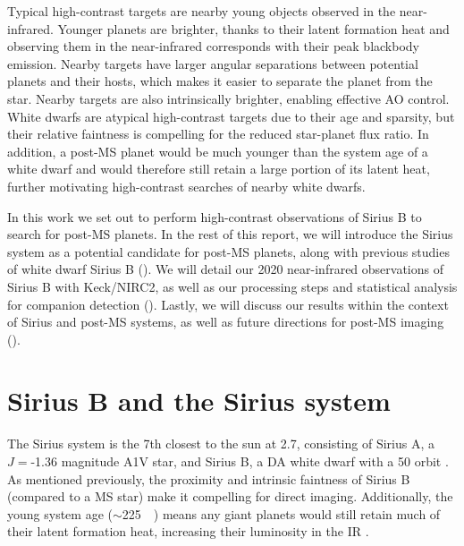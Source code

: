 \documentclass[twocolumn,linenumbers]{aastex631}
\begin{document}
Typical high-contrast targets are nearby young objects observed in the near-infrared. Younger planets are brighter, thanks to their latent formation heat \citep{fortneyGiantPlanetInterior2010} and observing them in the near-infrared corresponds with their peak blackbody emission. Nearby targets have larger angular separations between potential planets and their hosts, which makes it easier to separate the planet from the star. Nearby targets are also intrinsically brighter, enabling effective AO control. White dwarfs are atypical high-contrast targets due to their age and sparsity, but their relative faintness is compelling for the reduced star-planet flux ratio. In addition, a post-MS planet would be much younger than the system age of a white dwarf and would therefore still retain a large portion of its latent heat, further motivating high-contrast searches of nearby white dwarfs.

In this work we set out to perform high-contrast observations of Sirius B to search for post-MS planets. In the rest of this report, we will introduce the Sirius system as a potential candidate for post-MS planets, along with previous studies of white dwarf Sirius B (). We will detail our 2020 near-infrared observations of Sirius B with Keck/NIRC2, as well as our processing steps and statistical analysis for companion detection (). Lastly, we will discuss our results within the context of Sirius and post-MS systems, as well as future directions for post-MS imaging ().

\section{Sirius B and the Sirius system}\label{sec:sirius}

The Sirius system is the 7th closest to the sun at \qty{2.7}{\parsec}, consisting of Sirius A, a $J=$-1.36 magnitude A1V star, and Sirius B, a DA white dwarf with a \qty{50}{\year} orbit \citep{gaiacollaborationGaiaMission2016,bondSiriusSystemIts2017,gaiacollaborationGaiaEarlyData2021}. As mentioned previously, the proximity and intrinsic faintness of Sirius B (compared to a MS star) make it compelling for direct imaging. Additionally, the young system age ($\sim$\qty{225}{\mega\year}) means any giant planets would still retain much of their latent formation heat, increasing their luminosity in the IR \citep{fortneyGiantPlanetInterior2010}.
\end{document}
